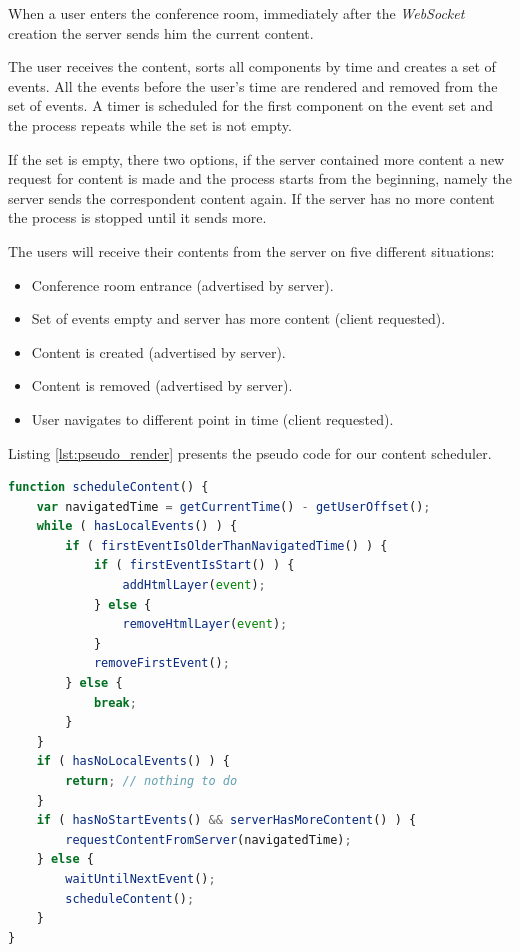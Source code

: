	When a user enters the conference room, immediately after the \emph{WebSocket} creation the server sends him the current content.

	The user receives the content, sorts all components by time and creates a set of events. All the events before the user's time are rendered and removed from the set of events. A timer is scheduled for the first component on the event set and the process repeats while the set is not empty.

	If the set is empty, there two options, if the server contained more content a new request for content is made and the process starts from the beginning, namely the server sends the correspondent content again. If the server has no more content the process is stopped until it sends more.

	The users will receive their contents from the server on five different situations:

	\begin{itemize}
		\item Conference room entrance (advertised by server).
		\item Set of events empty and server has more content (client requested).
		\item Content is created (advertised by server).
		\item Content is removed (advertised by server).
		\item User navigates to different point in time (client requested).
	\end{itemize}



	Listing \ref{lst:pseudo_render} presents the pseudo code for our content scheduler.

\begin{minipage}[!htb]{\linewidth}
\begin{lstlisting}[caption={Pseudo code for hyper content scheduler},label={lst:pseudo_render},language=JavaScript]
function scheduleContent() {
    var navigatedTime = getCurrentTime() - getUserOffset();
    while ( hasLocalEvents() ) {
        if ( firstEventIsOlderThanNavigatedTime() ) {
            if ( firstEventIsStart() ) {
            	addHtmlLayer(event);
            } else {
            	removeHtmlLayer(event);
            }
            removeFirstEvent();
        } else {
            break;
        }
    }
    if ( hasNoLocalEvents() ) {
    	return;	// nothing to do
    } 
    if ( hasNoStartEvents() && serverHasMoreContent() ) { 
       	requestContentFromServer(navigatedTime);
    } else {
        waitUntilNextEvent();
        scheduleContent();
    }
}
\end{lstlisting}
\end{minipage}

